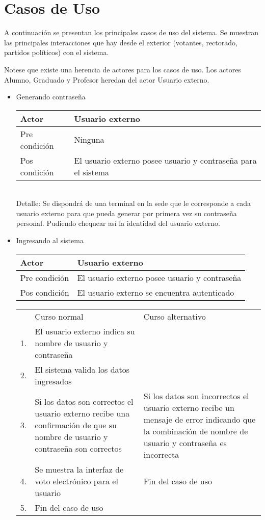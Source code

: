 \section{Casos de Uso}

A continuaci\'on se presentan los principales casos de uso del sistema.
Se muestran las principales interacciones que hay desde el exterior (votantes, rectorado, partidos pol\'iticos) con el sistema.

Notese que existe una herencia de actores para los casos de uso. Los actores Alumno, Graduado y Profesor heredan del actor Usuario externo.


\begin{itemize}
\bigskip
\item Generando contraseña
\bigskip
\begin{center}
\begin{tabular}{ll}
Actor & Usuario externo \\
\hline
Pre condición & Ninguna \\
\hline
Pos condición & El usuario externo posee usuario y contraseña para el sistema\\
\hline
\end{tabular}
\medskip
\\
Detalle: Se dispondrá de una terminal en la sede que le corresponde a cada usuario externo para que pueda generar por primera vez su contraseña personal. Pudiendo chequear así la identidad del usuario externo.
\end{center}

\bigskip
\item Ingresando al sistema
\bigskip
\begin{center}
\begin{tabular}{ll}
Actor & Usuario externo\\
\hline
Pre condición & El usuario externo posee usuario y contraseña \\
\hline
Pos condición & El usuario externo se encuentra autenticado\\
\hline
\end{tabular}
\medskip
\begin{tabular}{c p{4cm}|p{4cm}}
 & Curso normal & Curso alternativo \\
 1. & El usuario externo indica su nombre de usuario y contraseña &  \\
 2. & El sistema valida los datos ingresados & \\
 3. & Si los datos son correctos el usuario externo recibe una confirmación de que su nombre de usuario y contraseña son correctos & Si los datos son incorrectos el usuario externo recibe un mensaje de error indicando que la combinación de nombre de usuario y contraseña es incorrecta \\
 4. & Se muestra la interfaz de voto electrónico para el usuario & Fin del caso de uso \\
 5. & Fin del caso de uso& \\ 
\end{tabular}
\end{center}



\end{itemize}

